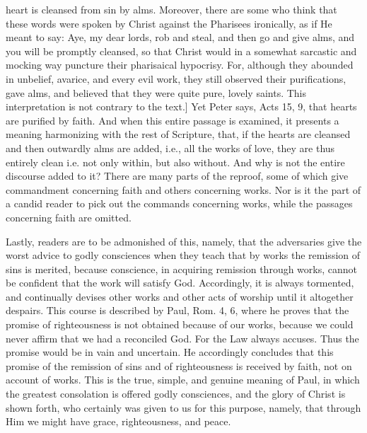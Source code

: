 heart is cleansed from sin by alms.  Moreover, there are some who
think that these words were spoken by Christ against the Pharisees
ironically, as if He meant to say: Aye, my dear lords, rob and steal,
and then go and give alms, and you will be promptly cleansed, so that
Christ would in a somewhat sarcastic and mocking way puncture their
pharisaical hypocrisy.  For, although they abounded in unbelief,
avarice, and every evil work, they still observed their purifications,
gave alms, and believed that they were quite pure, lovely saints.
This interpretation is not contrary to the text.] Yet Peter says,
Acts 15, 9, that hearts are purified by faith.  And when this entire
passage is examined, it presents a meaning harmonizing with the rest
of Scripture, that, if the hearts are cleansed and then outwardly
alms are added, i.e., all the works of love, they are thus entirely
clean i.e. not only within, but also without.  And why is not the
entire discourse added to it?  There are many parts of the reproof,
some of which give commandment concerning faith and others concerning
works.  Nor is it the part of a candid reader to pick out the
commands concerning works, while the passages concerning faith are
omitted.

Lastly, readers are to be admonished of this, namely, that the
adversaries give the worst advice to godly consciences when they
teach that by works the remission of sins is merited, because
conscience, in acquiring remission through works, cannot be confident
that the work will satisfy God.  Accordingly, it is always tormented,
and continually devises other works and other acts of worship until
it altogether despairs.  This course is described by Paul, Rom. 4, 6,
where he proves that the promise of righteousness is not obtained
because of our works, because we could never affirm that we had a
reconciled God.  For the Law always accuses.  Thus the promise would
be in vain and uncertain.  He accordingly concludes that this promise
of the remission of sins and of righteousness is received by faith,
not on account of works.  This is the true, simple, and genuine
meaning of Paul, in which the greatest consolation is offered godly
consciences, and the glory of Christ is shown forth, who certainly
was given to us for this purpose, namely, that through Him we might
have grace, righteousness, and peace.

